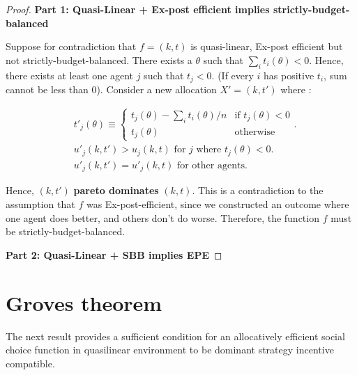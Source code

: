 \documentclass[10pt,a4paper]{article}
\begin{document}
\begin{proof}
\textbf{Part 1: Quasi-Linear + Ex-post efficient  implies strictly-budget-balanced}

Suppose for contradiction that $f = (k, t)$ is quasi-linear, Ex-post efficient but not strictly-budget-balanced.
There exists a $\theta$ such that 
$\sum_i t_i(\theta) < 0$. Hence, there exists at least
one agent $j$ such that $t_j < 0$. (If every $i$ has positive $t_i$, sum cannot be less than 0).
Consider a new allocation $X' = (k, t')$ where :

\begin{align*}
&t'_j(\theta) \equiv
\begin{cases}
    t_j(\theta) -  \sum_i t_i(\theta)/n & \text{if $t_j(\theta) < 0$} \\
    t_j(\theta) & \text{otherwise}
\end{cases}. \\
&u'_j(k, t') > u_j(k, t) \text{ for $j$ where $t_j(\theta) < 0$}. \\
&u'_j(k, t') = u'_j(k, t) \text{ for other agents}.
\end{align*}

Hence, $(k, t')$ \textbf{pareto dominates} $(k, t)$. This is a contradiction
to the assumption that $f$ was Ex-post-efficient, since we constructed an
outcome where one agent does better, and others don't do worse.
Therefore, the function $f$ must be strictly-budget-balanced.


\textbf{Part 2: Quasi-Linear + SBB implies EPE}

\end{proof}


\section{Groves theorem}
The next result provides a sufficient condition for an allocatively efficient
social choice function in quasilinear environment to be dominant strategy
incentive compatible. 
\end{document}
